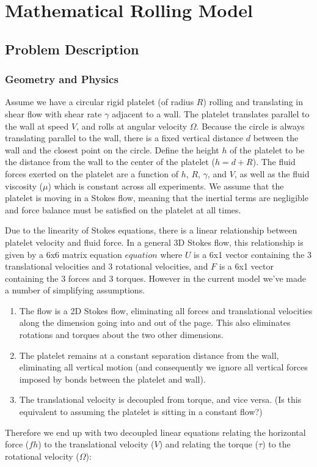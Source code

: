 
\chapter{Mathematical Rolling Model}

\section{Problem Description}
\label{sec:problem-description}

\subsection{Geometry and Physics}
\label{sec:geometry-physics}

Assume we have a circular rigid platelet (of radius $R$) rolling and
translating in shear flow with shear rate $\gamma$ adjacent to a
wall. The platelet translates parallel to the wall at speed $V$, and
rolls at angular velocity $\Omega$. Because the circle is always
translating parallel to the wall, there is a fixed vertical distance
$d$ between the wall and the closest point on the circle. Define the
height $h$ of the platelet to be the distance from the wall to the
center of the platelet ($h = d + R$). The fluid forces exerted on the
platelet are a function of $h$, $R$, $\gamma$, and $V$, as well as the
fluid viscosity ($\mu$) which is constant across all experiments. We
assume that the platelet is moving in a Stokes flow, meaning that the
inertial terms are negligible and force balance must be satisfied on
the platelet at all times.

Due to the linearity of Stokes equations, there is a linear
relationship between platelet velocity and fluid force. In a general
3D Stokes flow, this relationship is given by a 6x6 matrix equation
$equation$ where $U$ is a 6x1 vector containing the 3 translational
velocities and 3 rotational velocities, and $F$ is a 6x1 vector
containing the 3 forces and 3 torques. However in the current model
we've made a number of simplifying assumptions.
\begin{enumerate}
\item The flow is a 2D Stokes flow, eliminating all forces and
  translational velocities along the dimension going into and out of
  the page. This also eliminates rotations and torques about the two
  other dimensions.
\item The platelet remains at a constant separation distance from the
  wall, eliminating all vertical motion (and consequently we ignore
  all vertical forces imposed by bonds between the platelet and
  wall).
\item The translational velocity is decoupled from torque, and vice
  versa. (Is this equivalent to assuming the platelet is sitting in a
  constant flow?)
\end{enumerate}
Therefore we end up with two decoupled linear equations relating the
horizontal force ($fh$) to the translational velocity ($V$) and
relating the torque ($\tau$) to the rotational velocity ($\Omega$):


